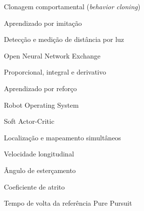 \documentclass[
	12pt,					%
	openright,				%
	twoside,					%
	a4paper,					%
	english,					%
	brazil					%
	]{abntex2}
\begin{document}
\frenchspacing

\pretextual



\imprimirfolhaderosto*



%






\listoffigures*
\cleardoublepage

\listoftables*
\cleardoublepage

\begin{siglas}
    \item[BC] Clonagem comportamental (\textit{behavior cloning})
    \item[IL] Aprendizado por imitação
    \item[LiDAR] Detecção e medição de distância por luz
    \item[ONNX] Open Neural Network Exchange
    \item[PID] Proporcional, integral e derivativo
    \item[RL] Aprendizado por reforço
    \item[ROS] Robot Operating System
    \item[SAC] Soft Actor-Critic
    \item[SLAM] Localização e mapeamento simultâneos
\end{siglas}

\begin{simbolos}
    \item[$v$] Velocidade longitudinal
    \item[$\delta$] Ângulo de esterçamento
    \item[$\mu$] Coeficiente de atrito
    \item[$T_{pp}$] Tempo de volta da referência Pure Pursuit
\end{simbolos}
\end{document}
